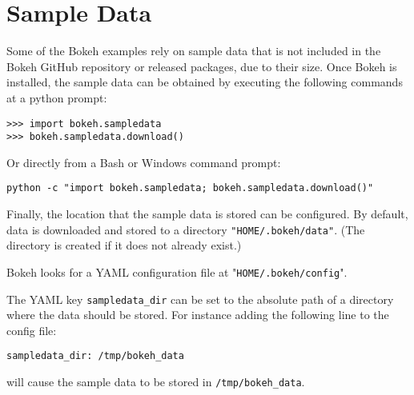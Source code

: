 \documentclass[a4paper,12pt]{article}
\begin{document}
\large
	\section{Sample Data}


Some of the Bokeh examples rely on sample data that is not included in the Bokeh GitHub repository or released packages, due to their size. Once Bokeh is installed, the sample data can be obtained by executing the following commands at a python prompt:

\begin{framed}
\begin{verbatim}
>>> import bokeh.sampledata
>>> bokeh.sampledata.download()
\end{verbatim}
\end{framed}

Or directly from a Bash or Windows command prompt:
\begin{framed}
	\begin{verbatim}
python -c "import bokeh.sampledata; bokeh.sampledata.download()"
\end{verbatim}
\end{framed}

Finally, the location that the sample data is stored can be configured. 
By default, data is downloaded and stored to a directory \texttt{"HOME/.bokeh/data"}. 
(The directory is created if it does not already exist.) 

Bokeh looks for a YAML configuration file at "\texttt{HOME/.bokeh/config}". 

The YAML key \texttt{sampledata\_dir} can be set to the absolute path of a directory 
where the data should be stored. For instance adding the following line to the config file:
\begin{framed}
	\begin{verbatim}
sampledata_dir: /tmp/bokeh_data
\end{verbatim}
\end{framed}
will cause the sample data to be stored in \texttt{/tmp/bokeh\_data}.

\end{document}
